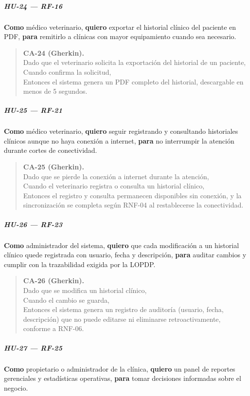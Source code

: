 \documentclass[
]{article}
\begin{document}
\subparagraph{HU-24 --- RF-16}
\textbf{Como} médico veterinario,
\textbf{quiero} exportar el historial clínico del paciente en PDF,
\textbf{para} remitirlo a clínicas con mayor equipamiento cuando sea necesario.

\begin{quote}
\textbf{CA-24 (Gherkin).} \\
Dado que el veterinario solicita la exportación del historial de un paciente, \\
Cuando confirma la solicitud, \\
Entonces el sistema genera un PDF completo del historial, descargable en menos de 5 segundos.
\end{quote}

\subparagraph{HU-25 --- RF-21}
\textbf{Como} médico veterinario,
\textbf{quiero} seguir registrando y consultando historiales clínicos aunque no haya conexión a internet,
\textbf{para} no interrumpir la atención durante cortes de conectividad.

\begin{quote}
\textbf{CA-25 (Gherkin).} \\
Dado que se pierde la conexión a internet durante la atención, \\
Cuando el veterinario registra o consulta un historial clínico, \\
Entonces el registro y consulta permanecen disponibles sin conexión, y la sincronización se completa según RNF-04 al restablecerse la conectividad.
\end{quote}

\subparagraph{HU-26 --- RF-23}
\textbf{Como} administrador del sistema,
\textbf{quiero} que cada modificación a un historial clínico quede registrada con usuario, fecha y descripción,
\textbf{para} auditar cambios y cumplir con la trazabilidad exigida por la LOPDP.

\begin{quote}
\textbf{CA-26 (Gherkin).} \\
Dado que se modifica un historial clínico, \\
Cuando el cambio se guarda, \\
Entonces el sistema genera un registro de auditoría (usuario, fecha, descripción) que no puede editarse ni eliminarse retroactivamente, conforme a RNF-06.
\end{quote}

\subparagraph{HU-27 --- RF-25}
\textbf{Como} propietario o administrador de la clínica,
\textbf{quiero} un panel de reportes gerenciales y estadísticas operativas,
\textbf{para} tomar decisiones informadas sobre el negocio.
\end{document}
